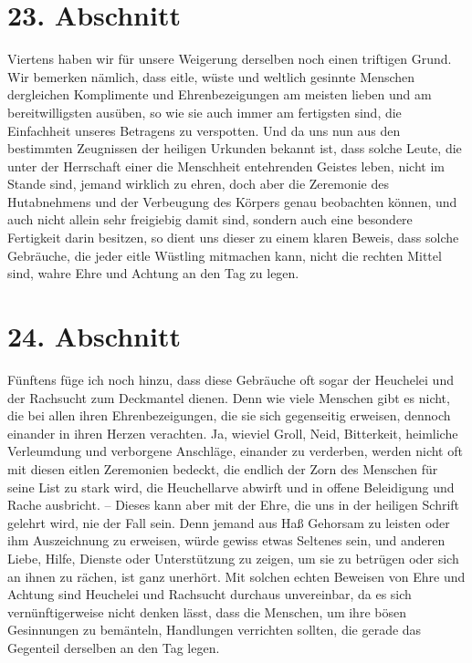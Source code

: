 \section{23. Abschnitt} \label{kap9_ab23}

Viertens haben wir für unsere Weigerung derselben noch einen triftigen Grund.
Wir bemerken nämlich, dass eitle, wüste und weltlich gesinnte Menschen
dergleichen
Komplimente und Ehrenbezeigungen am meisten lieben und am bereitwilligsten
ausüben, so wie sie auch immer am fertigsten sind, die Einfachheit unseres
Betragens zu verspotten. Und da uns nun aus den bestimmten Zeugnissen der
heiligen Urkunden bekannt ist, dass solche Leute, die unter der Herrschaft einer
die Menschheit entehrenden Geistes leben, nicht im Stande sind, jemand wirklich
zu ehren, doch aber die Zeremonie des Hutabnehmens und der Verbeugung des
Körpers genau beobachten können, und auch nicht allein sehr freigiebig damit
sind, sondern auch eine besondere Fertigkeit darin besitzen, so dient uns
dieser zu einem klaren Beweis, dass solche Gebräuche, die jeder eitle Wüstling
mitmachen kann, nicht die rechten Mittel sind, wahre Ehre und Achtung an den Tag
zu legen.

\section{24. Abschnitt} \label{kap9_ab24}

Fünftens füge ich noch hinzu, dass diese Gebräuche oft sogar der
Heuchelei und
der Rachsucht zum Deckmantel dienen. Denn wie viele Menschen gibt es nicht, die
bei allen ihren Ehrenbezeigungen, die sie sich gegenseitig erweisen, dennoch
einander in ihren Herzen verachten. Ja, wieviel Groll, Neid, Bitterkeit,
heimliche Verleumdung und verborgene Anschläge, einander zu verderben, werden
nicht oft mit diesen eitlen Zeremonien bedeckt, die endlich der Zorn des
Menschen für seine List zu stark wird, die Heuchellarve abwirft und in offene
Beleidigung und Rache ausbricht. -- Dieses kann aber mit der Ehre, die uns in
der heiligen Schrift gelehrt wird, nie der Fall sein. Denn jemand aus Haß
Gehorsam zu leisten oder ihm Auszeichnung zu erweisen, würde gewiss etwas
Seltenes sein, und anderen Liebe, Hilfe, Dienste oder Unterstützung zu zeigen,
um sie zu betrügen oder sich an ihnen zu rächen, ist ganz unerhört. Mit solchen
echten Beweisen von Ehre und Achtung sind Heuchelei und Rachsucht durchaus
unvereinbar, da es sich vernünftigerweise nicht denken lässt, dass die Menschen,
um ihre bösen Gesinnungen zu bemänteln, Handlungen verrichten sollten, die
gerade das Gegenteil derselben an den Tag legen.

